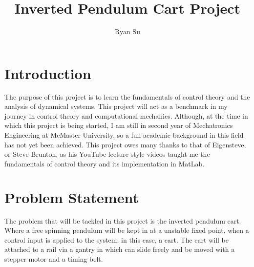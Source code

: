 \documentclass{article}
\title{Inverted Pendulum Cart Project}
\author{Ryan Su}
\begin{document}
\maketitle
\newpage
\tableofcontents
\newpage
\section{Introduction}
The purpose of this project is to learn the fundamentals of control theory and 
the analysis of dynamical systems. This project will act as a benchmark in my 
journey in control theory and computational mechanics. Although, at the time in which 
this project is being started, I am still in second year of Mechatronics Engineering 
at McMaster University, so a full academic background in this field has not yet been
achieved. This project owes many thanks to that of Eigensteve, or Steve Brunton, as his YouTube lecture 
style videos taught me the fundamentals of control theory and its implementation in MatLab. 
\section{Problem Statement}
The problem that will be tackled in this project is the inverted pendulum cart. Where
a free spinning pendulum will be kept in at a unstable fixed point, when a control input 
is applied to the system; in this case, a cart. The cart will be attached to a rail
via a gantry in which can slide freely and be moved with a stepper motor and a timing 
belt. 
\end{document}
